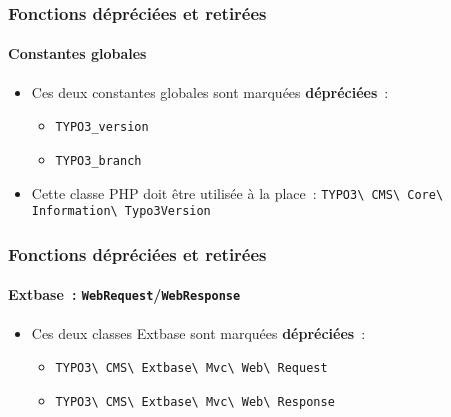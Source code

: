\begin{frame}[fragile]
	\frametitle{Fonctions dépréciées et retirées}
	\framesubtitle{Constantes globales}

	\lstset{basicstyle=\smaller\ttfamily}

	\begin{itemize}
		\item Ces deux constantes globales sont marquées \textbf{dépréciées}~:

			\begin{itemize}
				\item \texttt{TYPO3\_version}
				\item \texttt{TYPO3\_branch}
			\end{itemize}

		\item Cette classe PHP doit être utilisée à la place~:\newline
			\small
				\texttt{TYPO3\textbackslash
					CMS\textbackslash
					Core\textbackslash
					Information\textbackslash
					Typo3Version}\normalsize

	\end{itemize}

\end{frame}


\begin{frame}[fragile]
	\frametitle{Fonctions dépréciées et retirées}
	\framesubtitle{Extbase~: \texttt{WebRequest}/\texttt{WebResponse}}

	\begin{itemize}
		\item Ces deux classes Extbase sont marquées \textbf{dépréciées}~:
			\begin{itemize}
				\item \texttt{TYPO3\textbackslash
					CMS\textbackslash
					Extbase\textbackslash
					Mvc\textbackslash
					Web\textbackslash
					Request}
				\item \texttt{TYPO3\textbackslash
					CMS\textbackslash
					Extbase\textbackslash
					Mvc\textbackslash
					Web\textbackslash
					Response}
			\end{itemize}

	\end{itemize}

\end{frame}

